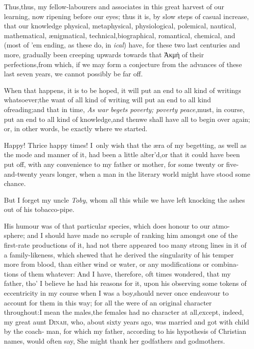 \documentclass{article}
\begin{document}
Thus,\tsk  thus, my fellow-labourers and associates in this great harvest of
our learning, now ripening before our eyes; thus it is, by slow steps of casual
increase, that our knowledge physical, metaphysical, physiological, polemical,
nautical, mathematical, ænigmatical, technical,\break biographical, romantical,
chemical, and 
\break
(most of ’em ending, as these do, in \textit{ical}) 
have, for these two last centuries and more, gradually been creeping upwards towards that Ἀκμὴ of their
perfections,\break from which, if we may form a conjecture from the advances of these last
seven years, we cannot possibly be far off.

When that happens, it is to be hoped, it will put an end to all
kind of writings whatsoever;\tsk  the want of all kind of writing
will put an end to all kind of\break reading;\tsk  and that in time,
\textit{As war be\-gets poverty; poverty peace},\tsh  must, in
course, put an end to all kind of know\-ledge,\tsk  and
then\tsh  we shall have all to begin over again; or, in
other words, be exactly where we started.

\tsh  Happy! Thrice happy times! I~only wish that the æra of my begetting, as well
as the mode and manner of it, had been a little alter’d,\tsk  or that it could have
been put off, with any convenience to my father or mother, for some twenty or
five-and-twenty years longer, when a man in the literary world might have\break
stood some chance.\tsh 

But I forget my uncle \textit{Toby}, whom all this while we have
left knocking the ashes out of his tobacco-pipe.

His humour was of that particular\break
species, which does honour to our atmo-
sphere; and I should have made no scruple of ranking him
amongst one of the first-rate productions of it, had not there
appeared too many strong lines in it of a family-likeness, which
shewed that he derived the singularity of his temper\break
more from blood, than either wind or\break 
water, or any modifications or combina-\break
tions of them whatever: And I have, therefore, oft times
wondered, that my father, tho’ I believe he had his reasons
for it, upon his observing some tokens of eccentricity in my
course when I was a boy,\tsk  should never once endeavour to
account for them in this way; for all the\break
{} were of an original character
throughout:\tsh  I mean the males,\tsk  the females had no
character at all,\tsk  except, indeed, my great aunt
\textsc{Dinah}, who, about sixty years ago, was married and got with child by the
coach- man,
for which my father, according to his hypothesis of Christian
names, would often say, She might thank her godfathers and
godmothers.
\end{document}
